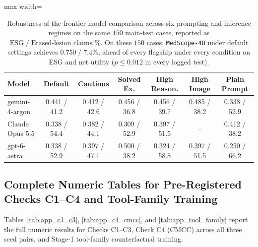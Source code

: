 \documentclass[5p,times,twocolumn,authoryear]{elsarticle}
\begin{document}
\begin{table}[!htbp]
\caption{Robustness of the frontier model comparison across six prompting and inference regimes on the same $150$ main-test cases, reported as $\text{ESG} \;/\; \text{Erased-lesion claims \%}$. On these $150$ cases, \texttt{MedScope-4B} under default settings achieves $\mathbf{0.750 \;/\; 7.4\%}$, ahead of every flagship under every condition on ESG and net utility ($p \le 0.012$ in every logged test).}
\label{tab:robustness_prompts}
\begin{center}
\small
\begin{adjustbox}{max width=\linewidth}
\begin{tabular}{lcccccc}
\toprule
\textbf{Model} & \textbf{Default} & \textbf{Cautious} & \textbf{Solved Ex.} & \textbf{High Reason.} & \textbf{High Image} & \textbf{Plain Prompt} \\
\midrule
gemini-4-argon & 0.441 / 41.2 & 0.412 / 42.6 & 0.456 / 36.8 & 0.456 / 39.7 & 0.485 / 38.2 & 0.338 / 52.9 \\
Claude Opus 5.5 & 0.338 / 54.4 & 0.382 / 44.1 & 0.309 / 52.9 & 0.397 / 51.5 & -- & 0.412 / 38.2 \\
gpt-6-astra & 0.338 / 52.9 & 0.397 / 47.1 & 0.500 / 38.2 & 0.324 / 58.8 & 0.397 / 51.5 & 0.250 / 66.2 \\
\bottomrule
\end{tabular}
\end{adjustbox}
\end{center}
\end{table}

\subsection{Complete Numeric Tables for Pre-Registered Checks C1--C4 and Tool-Family Training}
Tables~\ref{tab:app_c1_c3}, \ref{tab:app_c4_cmcc}, and \ref{tab:app_tool_family} report the full numeric results for Checks C1--C3, Check C4 (CMCC) across all three seed pairs, and Stage-1 tool-family counterfactual training.
\end{document}
